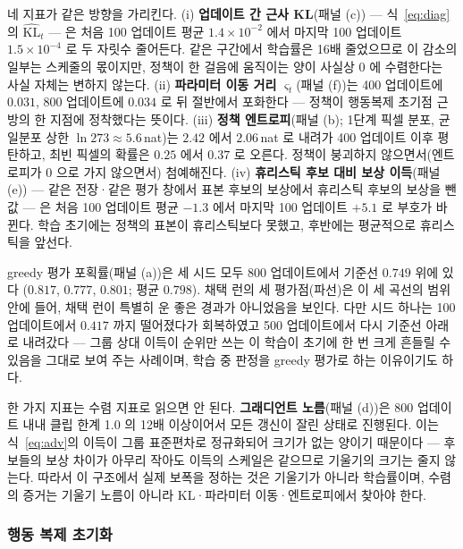 네 지표가 같은 방향을 가리킨다. (i) \textbf{업데이트 간 근사 KL}(패널 (c)) --- 식~\eqref{eq:diag}의
$\widehat{\mathrm{KL}}_t$ --- 은 처음 100 업데이트 평균
$1.4\times10^{-2}$ 에서 마지막 100 업데이트 $1.5\times10^{-4}$ 로 두 자릿수 줄어든다. 같은
구간에서 학습률은 16배 줄었으므로 이 감소의 일부는 스케줄의 몫이지만, 정책이 한 걸음에
움직이는 양이 사실상 0 에 수렴한다는 사실 자체는 변하지 않는다. (ii) \textbf{파라미터 이동
거리} $\varsigma_t$(패널 (f))는 400
업데이트에 $0.031$, 800 업데이트에 $0.034$ 로 뒤 절반에서 포화한다 --- 정책이 행동복제
초기점 근방의 한 지점에 정착했다는 뜻이다. (iii) \textbf{정책 엔트로피}(패널 (b); 1단계 픽셀
분포, 균일분포 상한 $\ln 273 \approx 5.6$\,nat)는 $2.42$ 에서 $2.06$\,nat 로 내려가 400
업데이트 이후 평탄하고, 최빈 픽셀의 확률은 $0.25$ 에서 $0.37$ 로 오른다. 정책이 붕괴하지
않으면서(엔트로피가 0 으로 가지 않으면서) 첨예해진다. (iv) \textbf{휴리스틱 후보 대비 보상
이득}(패널 (e)) --- 같은 전장·같은 평가 창에서 표본 후보의 보상에서 휴리스틱 후보의 보상을 뺀
값 --- 은 처음 100 업데이트 평균 $-1.3$ 에서 마지막 100 업데이트 $+5.1$ 로 부호가 바뀐다.
학습 초기에는 정책의 표본이 휴리스틱보다 못했고, 후반에는 평균적으로 휴리스틱을 앞선다.

greedy 평가 포획률(패널 (a))은 세 시드 모두 800 업데이트에서 기준선 $0.749$ 위에 있다
($0.817$, $0.777$, $0.801$; 평균 $0.798$). 채택 런의 세 평가점(파선)은 이 세 곡선의 범위
안에 들어, 채택 런이 특별히 운 좋은 경과가 아니었음을 보인다. 다만 시드 하나는 100
업데이트에서 $0.417$ 까지 떨어졌다가 회복하였고 500 업데이트에서 다시 기준선 아래로
내려갔다 --- 그룹 상대 이득이 순위만 쓰는 이 학습이 초기에 한 번 크게 흔들릴 수 있음을 그대로
보여 주는 사례이며, 학습 중 판정을 greedy 평가로 하는 이유이기도 하다.

한 가지 지표는 수렴 지표로 읽으면 안 된다. \textbf{그래디언트 노름}(패널 (d))은 800
업데이트 내내 클립 한계 1.0 의 12배 이상이어서 모든 갱신이 잘린 상태로 진행된다. 이는
식~\eqref{eq:adv}의 이득이 그룹 표준편차로 정규화되어 크기가 없는 양이기 때문이다 --- 후보들의
보상 차이가 아무리 작아도 이득의 스케일은 같으므로 기울기의 크기는 줄지 않는다. 따라서 이
구조에서 실제 보폭을 정하는 것은 기울기가 아니라 학습률이며, 수렴의 증거는 기울기 노름이
아니라 KL·파라미터 이동·엔트로피에서 찾아야 한다.

\subsubsection{행동 복제 초기화}
\label{sec:bc}

